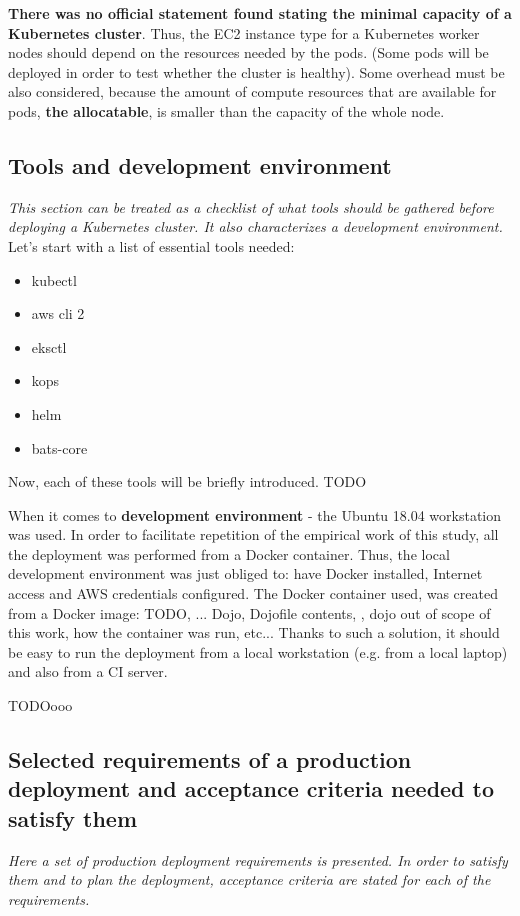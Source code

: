 \textbf{There was no official statement found stating the minimal capacity of a Kubernetes cluster}. Thus, the EC2 instance type for a Kubernetes worker nodes should depend on the resources needed by the pods. (Some pods will be deployed in order to test whether the cluster is healthy). Some overhead must be also considered, because the amount of compute resources that are available for pods, \textbf{the allocatable}, is smaller than the capacity of the whole node\cite{k8s-alloc}.

\subsection{Tools and development environment}
\label{tools}
\textit{This section can be treated as a checklist of what tools should be gathered before deploying a Kubernetes cluster. It also characterizes a development environment.}
\\

Let's start with a list of essential tools needed:
\begin{itemize}
\item kubectl
\item aws cli 2
\item eksctl
\item kops
\item helm
\item bats-core
\end{itemize}

Now, each of these tools will be briefly introduced. TODO

When it comes to \textbf{development environment} - the Ubuntu 18.04 workstation was used. In order to facilitate repetition of the empirical work of this study, all the deployment was performed from a Docker container. Thus, the local development environment was just obliged to: have Docker installed, Internet access and AWS credentials configured. The Docker container used, was created from a Docker image: TODO, ... Dojo, Dojofile contents, , dojo out of scope of this work, how the container was run, etc... Thanks to such a solution, it should be easy to run the deployment from a local workstation (e.g. from a local laptop) and also from a CI server.

TODOooo


\subsection{Selected requirements of a production deployment and acceptance criteria needed to satisfy them}
\textit{Here a set of production deployment requirements is presented. In order to satisfy them and to plan the deployment, acceptance criteria are stated for each of the requirements.}
\\


